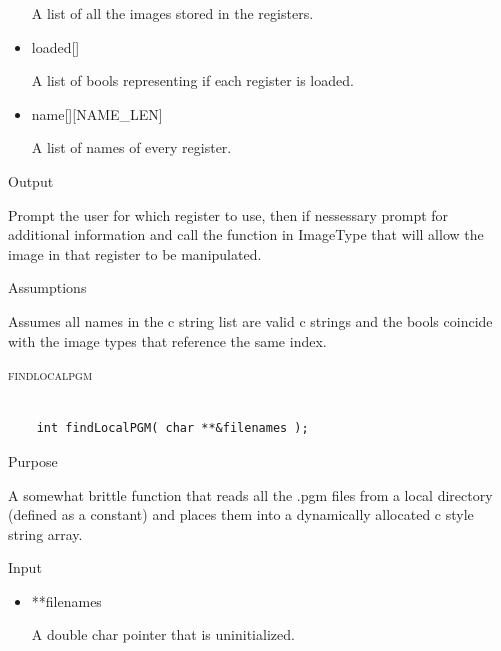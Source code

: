 \documentclass[pdftex, 11pt]{article}
\begin{document}
\begin{description}
\begin{description}
\begin{itemize}
						A list of all the images stored in the registers.

					\item{loaded[]}

						A list of bools representing if each register is loaded.

					\item{name[][NAME\_LEN]}

						A list of names of every register.

				\end{itemize}

			\item{Output}

				Prompt the user for which register to use, then if nessessary
				prompt for additional information and call the function
				in ImageType that will allow the image in that register to
				be manipulated.

			\item{Assumptions}

				Assumes all names in the c string list are valid c
				strings and the bools coincide with the image types that
				reference the same index.

		\end{description}



	\item{\textsc{findlocalpgm}}

		\begin{lstlisting}

	int findLocalPGM( char **&filenames );
		\end{lstlisting}

		\begin{description}
			\item{Purpose}

				A somewhat brittle function that reads all the .pgm files from a local
				directory (defined as a constant) and places them into a dynamically
				allocated c style string array.

			\item{Input}

				\begin{itemize}

					\item{**filenames}
						
						A double char pointer that is uninitialized.

				\end{itemize}


\end{description}
\end{description}
\end{document}
